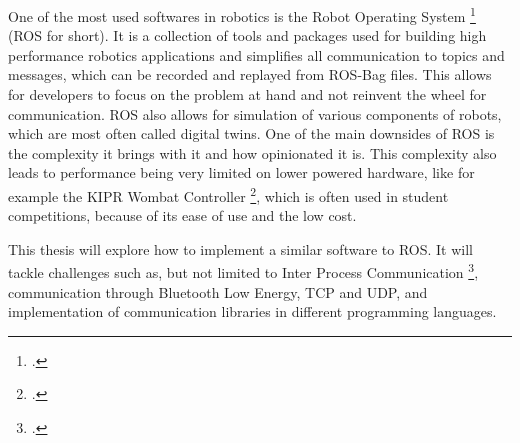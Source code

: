



One of the most used softwares in robotics is the Robot Operating System \footcite{ros-site} (ROS for short).
It is a collection of tools and packages used for building high performance robotics applications and
simplifies all communication to topics and messages, which can be recorded and replayed from ROS-Bag files.
This allows for developers to focus on the problem at hand and not reinvent the wheel for communication.
ROS also allows for simulation of various components of robots, which are most often called digital twins.
One of the main downsides of ROS is the complexity it brings with it and how opinionated it is. This complexity also leads to performance
being very limited on lower powered hardware, like for example the KIPR Wombat Controller \footcite{wombat-controller},
which is often used in student competitions, because of its ease of use and the low cost.

\medskip

This thesis will explore how to implement a similar software to ROS. It will tackle challenges such as, but not limited
to Inter Process Communication \footcite{ipc-begriff}, communication through Bluetooth Low Energy, TCP and UDP, and
implementation of communication libraries in different programming languages.
